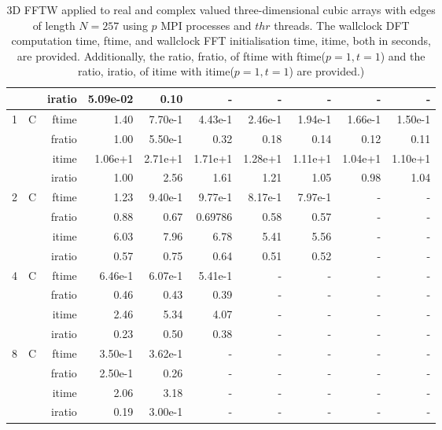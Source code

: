 \documentclass[a4paper]{article}
\begin{document}
\begin{table}[htbp]
\begin{center}
\begin{small}
\begin{tabular}{|r|r|r|r|r|r|r|r|r|r|}
             &             &  iratio &    5.09e-02 &   0.10 &      - &      - &      - &      - &      - \\\hline\hline
   1 &   C &  ftime &    1.40  &    7.70e-1 &    4.43e-1 &    2.46e-1 &    1.94e-1 &    1.66e-1 &    1.50e-1 \\
             &             &  fratio &    1.00 &    5.50e-1 &   0.32 &    0.18 &    0.14 &   0.12 &   0.11 \\
             &             &  itime &    1.06e+1 &   2.71e+1 &   1.71e+1 &   1.28e+1 &   1.11e+1 &   1.04e+1 &   1.10e+1 \\
             &             &  iratio &    1.00 &    2.56  &    1.61  &    1.21  &   1.05  &    0.98 &    1.04  \\\hline
   2 &  C &  ftime &    1.23  &    9.40e-1 &    9.77e-1 &    8.17e-1 &    7.97e-1 &      - &      - \\
             &             &  fratio &    0.88 &    0.67 &    0.69786 &    0.58 &    0.57 &      - &      - \\
             &             &  itime &    6.03  &    7.96  &    6.78  &    5.41  &    5.56  &      - &      - \\
             &             &  iratio &    0.57 &    0.75 &    0.64 &    0.51 &    0.52 &      - &      - \\\hline
   4 &  C &  ftime &    6.46e-1 &    6.07e-1 &    5.41e-1 &      - &      - &      - &      - \\
             &             &  fratio &    0.46 &    0.43 &   0.39 &      - &      - &      - &      - \\
             &             &  itime &    2.46  &    5.34  &    4.07  &      - &      - &      - &      - \\
             &             &  iratio &    0.23 &    0.50 &    0.38 &      - &      - &      - &      - \\\hline
   8 &   C &  ftime &    3.50e-1 &    3.62e-1 &      - &      - &      - &      - &      - \\
             &             &  fratio &    2.50e-1 &    0.26 &      - &      - &      - &      - &      - \\
             &             &  itime &    2.06  &    3.18  &      - &      - &      - &      - &      - \\
             &             &  iratio &    0.19 &    3.00e-1 &      - &      - &      - &      - &      - \\\hline
\end{tabular}
\caption{3D FFTW applied to real and complex valued three-dimensional cubic arrays with edges of length $N=257$ using $p$ MPI processes and $thr$ threads. The wallclock DFT computation time, ftime, and wallclock FFT initialisation time, itime, both in seconds, are provided. Additionally, the ratio, fratio, of ftime  with ftime($p=1,t=1$) and the ratio, iratio, of itime  with itime($p=1,t=1$) are provided.) }\label{Tbl:FFTW3d257}
\end{small}
\end{center}
\end{table}
\end{document}
